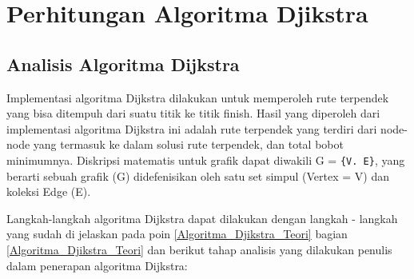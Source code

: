 \section{Perhitungan Algoritma Djikstra}
\subsection{Analisis Algoritma Dijkstra}
Implementasi algoritma Dijkstra dilakukan untuk memperoleh rute terpendek yang bisa ditempuh dari suatu titik ke titik finish. Hasil yang diperoleh dari implementasi algoritma Dijkstra ini adalah rute terpendek yang terdiri dari node-node yang termasuk ke dalam solusi rute terpendek, dan total bobot minimumnya. Diskripsi matematis untuk grafik dapat diwakili G = \verb|{V. E}|, yang berarti sebuah grafik (G) didefenisikan oleh satu set simpul (Vertex = V) dan koleksi Edge (E).

Langkah-langkah algoritma Dijkstra dapat dilakukan dengan  langkah - langkah yang sudah di jelaskan pada poin \ref{Algoritma_Djikstra_Teori} bagian \ref{Algoritma_Djikstra_Teori} dan berikut tahap analisis yang dilakukan penulis dalam penerapan algoritma Dijkstra:

